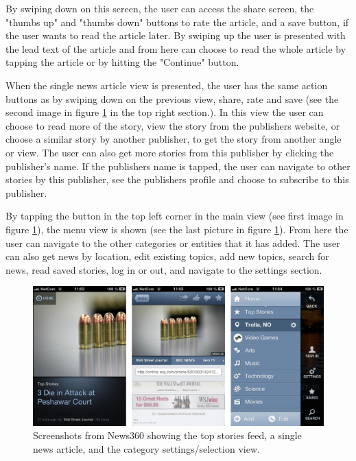 By swiping down on this screen, the user can access the share screen, the "thumbs up" and "thumbs down" buttons to rate the article, and a save button, if the user wants to read the article later. By swiping up the user is presented with the lead text of the article and from here can choose to read the whole article by tapping the article or by hitting the "Continue" button.

When the single news article view is presented, the user has the same action buttons as by swiping down on the previous view, share, rate and save (see the second image in figure \ref{screenshots_news360} in the top right section.). In this view the user can choose to read more of the story, view the story from the publishers website, or choose a similar story by another publisher, to get the story from another angle or view. The user can also get more stories from this publisher by clicking the publisher's name. If the publishers name is tapped, the user can navigate to other stories by this publisher, see the publishers profile and choose to subscribe to this publisher.

By tapping the button in the top left corner in the main view (see first image in figure \ref{screenshots_news360}), the menu view is shown (see the last picture in figure \ref{screenshots_news360}). From here the user can navigate to the other categories or entities that it has added. The user can also get news by location, edit existing topics, add new topics, search for news, read saved stories, log in or out, and navigate to the settings section.


\begin{figure}[!htbp]
\centering
\includegraphics[width=130mm]{GFX/screenshots/news360.png}
\caption{Screenshots from News360 showing the top stories feed, a single news article, and the category settings/selection view.}
\label{screenshots_news360}
\end{figure}

